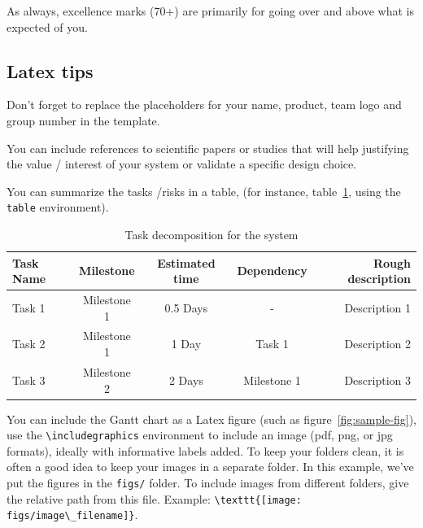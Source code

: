 \documentclass{article}
\begin{document}
As always, excellence marks (70+) are primarily for going over and above what is expected of you.

\subsection*{Latex tips}

Don't forget to replace the placeholders for your name, product, team logo and group number in the template.

You can include references to scientific papers \cite{langley00} or studies that will help justifying the value / interest of your system or validate a specific design choice.

You can summarize the tasks /risks in a table, (for instance, table~\ref{tab:sample-table}, using the \verb+table+ environment).

\begin{table}[h]
\vskip 3mm
\begin{center}
\begin{small}
\begin{sc}
\begin{tabular}{lcccr}
\hline
\abovespace\belowspace
Task Name & Milestone  & Estimated time & Dependency &  Rough description \\
\hline
\abovespace
Task 1 & Milestone 1    & 0.5 Days & - & Description 1 \\
Task 2 & Milestone 1    & 1 Day  & Task 1 & Description 2 \\
Task 3 & Milestone 2    & 2 Days & Milestone 1 & Description 3 
\belowspace
\end{tabular}
\end{sc}
\end{small}
\caption{Task decomposition for the system}
\label{tab:sample-table}
\end{center}
\vskip -3mm
\end{table}


You can include the Gantt chart as a Latex figure (such as figure~\ref{fig:sample-fig}), use the \verb+\includegraphics+ environment to include an image (pdf, png, or jpg formats), ideally with informative labels added. 
To keep your folders clean, it is often a good idea to keep your images in a separate folder. In this example, we've put the figures in the \texttt{figs/} folder. To include images from different folders, give the relative path from this file. Example: \verb+\texttt{[image: figs/image\_filename]}+.
\end{document}

